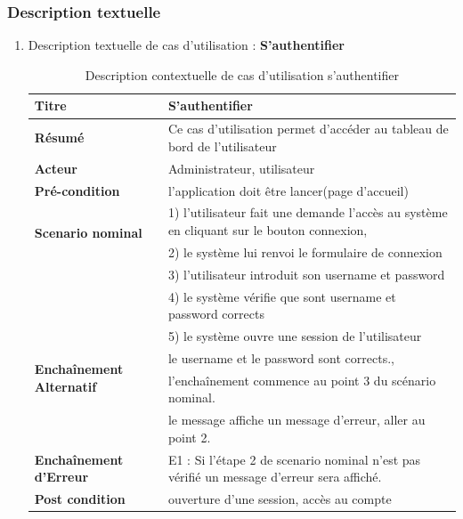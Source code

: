 \begin{enumerate}
				\end{enumerate}
				
				\subsubsection{Description textuelle}
					\begin{enumerate}
						\item Description textuelle de cas d'utilisation : \textbf{S'authentifier}
							\begin{table}[H]
								\centering
								\caption{Description contextuelle de cas d'utilisation s'authentifier}
								\begin{tabular}{|l|p{11cm}|}
								\hline 
									\textbf{Titre} & S'authentifier \\ 
								\hline 
									\textbf{Résumé} & Ce cas d'utilisation permet d'accéder au tableau de bord de l'utilisateur \\ 
								\hline 
									\textbf{Acteur} & Administrateur, utilisateur \\  
								\hline 
									\textbf{Pré-condition} & l'application doit être lancer(page d'accueil) \\ 
								\hline 
								\multirow{2}{*}{\textbf{Scenario nominal}} & 1) l'utilisateur fait une demande l'accès au système en cliquant sur le bouton connexion, \\
							 & 2) le système lui renvoi le formulaire de connexion \\
							 & 3) l'utilisateur introduit son username et password \\
							 & 4) le système vérifie que  sont username et password corrects \\
							 & 5) le système ouvre une session de l'utilisateur \\
							\hline 
								\multirow{2}{*}{\textbf{Enchaînement Alternatif}} & le username et le password sont corrects., \\
							    & l'enchaînement commence au point 3 du scénario nominal. \\
							    & le message affiche un message d'erreur, aller au point 2. \\
							\hline 
								\textbf{Enchaînement d'Erreur} & E1 : Si l'étape 2 de scenario nominal n'est pas vérifié un message d'erreur sera affiché. \\
							\hline
								\textbf{Post condition} & ouverture d'une session, accès au compte\\
							\hline
						\end{tabular} 
					\end{table}
		

\end{enumerate}
